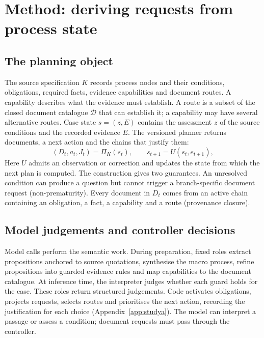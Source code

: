 \section{Method: deriving requests from process state}
\label{sec:method}

\subsection{The planning object}
The source specification $K$ records process nodes and their conditions,
obligations, required facts, evidence capabilities and document routes. A
capability describes what the evidence must establish. A route is a subset
of the closed document catalogue $\mathcal D$ that can establish it; a
capability may have several alternative routes. Case state $s=(z,E)$
contains the assessment $z$ of the source conditions and the recorded
evidence $E$. The versioned planner returns documents, a next action and
the chains that justify them:
\begin{equation}
(D_t,a_t,J_t)=\Pi_K(s_t),\qquad s_{t+1}=U(s_t,e_{t+1}),
\label{eq:loop}
\end{equation}
Here $U$ admits an observation or correction and updates the state from
which the next plan is computed. The construction gives two guarantees.
An unresolved condition can produce a question but cannot trigger a
branch-specific document request (non-prematurity). Every document in $D_t$
comes from an active chain containing an obligation, a fact, a capability
and a route (provenance closure).

\subsection{Model judgements and controller decisions}
Model calls perform the semantic work. During preparation, fixed roles
extract propositions anchored to source quotations, synthesise the macro
process, refine propositions into guarded evidence rules and map
capabilities to the document catalogue. At inference time, the interpreter
judges whether each guard holds for the case. These roles return structured
judgements. Code activates obligations, projects requests, selects routes
and prioritises the next action, recording the justification for each
choice (Appendix~\ref{app:studya}). The model can interpret a passage or
assess a condition; document requests must pass through the controller.

